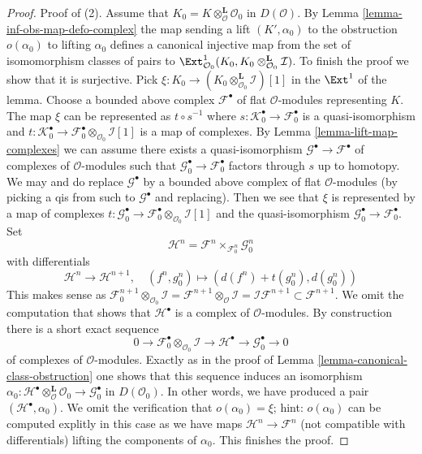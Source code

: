 \begin{proof}
\medskip\noindent
Proof of (2).
Assume that $K_0 = K \otimes_\mathcal{O}^\mathbf{L} \mathcal{O}_0$
in $D(\mathcal{O})$. By Lemma \ref{lemma-inf-obs-map-defo-complex}
the map sending a lift $(K', \alpha_0)$ to the obstruction $o(\alpha_0)$
to lifting $\alpha_0$ defines a canonical injective map
from the set of isomomorphism classes of pairs
to $\Ext^1_{\mathcal{O}_0}(K_0,
K_0 \otimes_{\mathcal{O}_0}^\mathbf{L} \mathcal{I})$.
To finish the proof we show that it is surjective.
Pick $\xi : K_0 \to (K_0 \otimes_{\mathcal{O}_0}^\mathbf{L} \mathcal{I})[1]$
in the $\Ext^1$ of the lemma.
Choose a bounded above complex $\mathcal{F}^\bullet$
of flat $\mathcal{O}$-modules representing $K$.
The map $\xi$ can be represented as $t \circ s^{-1}$
where $s : \mathcal{K}_0^\bullet \to \mathcal{F}_0^\bullet$
is a quasi-isomorphism and
$t : \mathcal{K}_0^\bullet \to
\mathcal{F}_0^\bullet \otimes_{\mathcal{O}_0} \mathcal{I}[1]$
is a map of complexes.
By Lemma \ref{lemma-lift-map-complexes}
we can assume there exists a quasi-isomorphism
$\mathcal{G}^\bullet \to \mathcal{F}^\bullet$
of complexes of $\mathcal{O}$-modules
such that $\mathcal{G}_0^\bullet \to \mathcal{F}_0^\bullet$
factors through $s$ up to homotopy.
We may and do replace $\mathcal{G}^\bullet$ by a bounded
above complex of flat $\mathcal{O}$-modules (by picking a qis
from such to $\mathcal{G}^\bullet$ and replacing).
Then we see that $\xi$ is represented by
a map of complexes
$t : \mathcal{G}_0^\bullet \to
\mathcal{F}_0^\bullet \otimes_{\mathcal{O}_0} \mathcal{I}[1]$
and the quasi-isomorphism $\mathcal{G}_0^\bullet \to \mathcal{F}_0^\bullet$.
Set
$$
\mathcal{H}^n = \mathcal{F}^n \times_{\mathcal{F}_0^n} \mathcal{G}_0^n
$$
with differentials
$$
\mathcal{H}^n \to \mathcal{H}^{n + 1},\quad
(f^n, g_0^n) \mapsto (d(f^n) + t(g_0^n), d(g_0^n))
$$
This makes sense as
$\mathcal{F}_0^{n + 1} \otimes_{\mathcal{O}_0} \mathcal{I} =
\mathcal{F}^{n + 1} \otimes_\mathcal{O} \mathcal{I} =
\mathcal{I}\mathcal{F}^{n + 1} \subset \mathcal{F}^{n + 1}$.
We omit the computation that shows that $\mathcal{H}^\bullet$
is a complex of $\mathcal{O}$-modules. By construction there is
a short exact sequence
$$
0 \to \mathcal{F}_0^\bullet \otimes_{\mathcal{O}_0} \mathcal{I} \to
\mathcal{H}^\bullet \to \mathcal{G}_0^\bullet \to 0
$$
of complexes of $\mathcal{O}$-modules.
Exactly as in the proof of Lemma \ref{lemma-canonical-class-obstruction}
one shows that this sequence induces an isomorphism
$\alpha_0 :
\mathcal{H}^\bullet \otimes_\mathcal{O}^\mathbf{L} \mathcal{O}_0 \to
\mathcal{G}_0^\bullet$ in $D(\mathcal{O}_0)$.
In other words, we have produced a pair $(\mathcal{H}^\bullet, \alpha_0)$.
We omit the verification that $o(\alpha_0) = \xi$; hint: $o(\alpha_0)$
can be computed explitly in this case as we have maps
$\mathcal{H}^n \to \mathcal{F}^n$ (not compatible with differentials)
lifting the components of $\alpha_0$. This finishes the proof.
\end{proof}


















